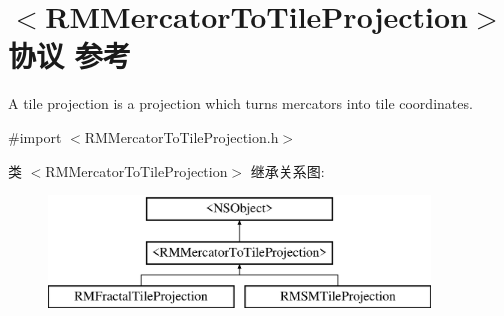 \hypertarget{protocol_r_m_mercator_to_tile_projection-p}{\section{$<$R\-M\-Mercator\-To\-Tile\-Projection$>$协议 参考}
\label{protocol_r_m_mercator_to_tile_projection-p}
}


A tile projection is a projection which turns mercators into tile coordinates.  




{\ttfamily \#import $<$R\-M\-Mercator\-To\-Tile\-Projection.\-h$>$}

类 $<$R\-M\-Mercator\-To\-Tile\-Projection$>$ 继承关系图\-:\begin{figure}[H]
\begin{center}
\leavevmode
\includegraphics[height=3.000000cm]{protocol_r_m_mercator_to_tile_projection-p}
\end{center}
\end{figure}
